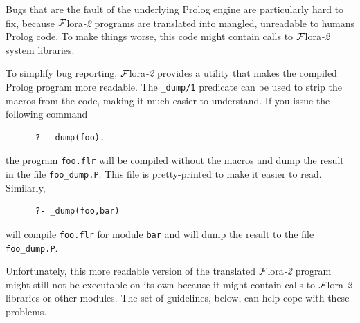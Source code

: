 \documentclass[11pt]{article}
\newcommand{\FLORA}{{\mbox{\sc ${\cal F}${lora}\rm\emph{-2}}}\xspace}
\begin{document}
Bugs that are the fault of the underlying Prolog engine are particularly
hard to fix, because \FLORA programs are translated into mangled,
unreadable to humans Prolog code.  To make things worse, this code might
contain calls to \FLORA system libraries.

To simplify bug reporting, \FLORA provides a utility that makes the compiled
Prolog program more readable. The {\tt \_dump/1}  predicate can be used to strip the
macros from the code, making it much easier to understand. If you issue the
following command
\begin{verbatim}
      ?- _dump(foo).  
\end{verbatim}
the program {\tt foo.flr} will be compiled without the macros and dump the
result in the file {\tt foo\_dump.P}. This file is pretty-printed to make
it easier to read. Similarly,
\begin{verbatim}
      ?- _dump(foo,bar)  
\end{verbatim}
will compile {\tt foo.flr} for module {\tt bar} and will dump the result to
the file {\tt foo\_dump.P}.

Unfortunately, this more readable version of the translated \FLORA program
might still not be executable on its own because it might contain calls to
\FLORA libraries or other modules.  The set of guidelines, below, can help
cope with these problems.
\end{document}
